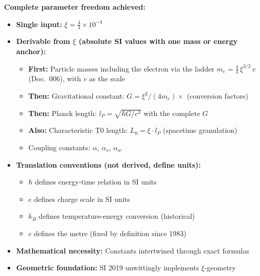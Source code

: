 	\begin{keyresult}
		\textbf{Complete parameter freedom achieved:}
		\begin{itemize}
			\item \textbf{Single input:} $\xi = \frac{4}{3} \times 10^{-4}$
			
			\item \textbf{Derivable from $\xi$ (absolute SI values with one mass or energy anchor):}
			\begin{itemize}
				\item \textbf{First:} Particle masses including the electron via the ladder $m_e = \frac{4}{3}\,\xi^{3/2}\,v$ (Doc.~006), with $v$ as the scale
				\item \textbf{Then:} Gravitational constant: $G = \xi^2/(4m_e) \times$ (conversion factors)
				\item \textbf{Then:} Planck length: $l_P = \sqrt{\hbar G/c^3}$ with the complete $G$
				\item \textbf{Also:} Characteristic T0 length: $L_0 = \xi \cdot l_P$ (spacetime granulation)
				\item Coupling constants: $\alpha$, $\alpha_s$, $\alpha_w$
			\end{itemize}
			
			\item \textbf{Translation conventions (not derived, define units):}
			\begin{itemize}
				\item $\hbar$ defines energy-time relation in SI units
				\item $e$ defines charge scale in SI units
				\item $k_B$ defines temperature-energy conversion (historical)
				\item $c$ defines the metre (fixed by definition since 1983)
			\end{itemize}
			
			\item \textbf{Mathematical necessity:} Constants intertwined through exact formulas
			
			\item \textbf{Geometric foundation:} SI 2019 unwittingly implements $\xi$-geometry
		\end{itemize}
	\end{keyresult}
	
